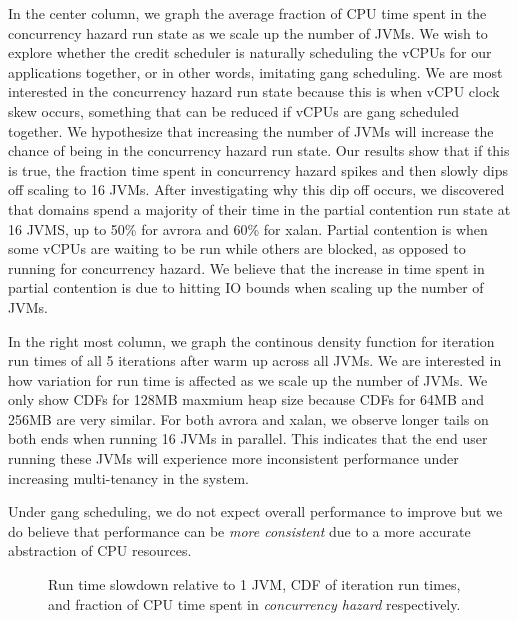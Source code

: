 \documentclass{sig-alternate}
\begin{document}
In the center column, we graph the average fraction of CPU time spent in the concurrency hazard run state as we scale up the number of JVMs. We wish to explore whether the credit scheduler is naturally scheduling the vCPUs for our applications together, or in other words, imitating gang scheduling. We are most interested in the concurrency hazard run state because this is when vCPU clock skew occurs, something that can be reduced if vCPUs are gang scheduled together. We hypothesize that increasing the number of JVMs will increase the chance of being in the concurrency hazard run state. Our results show that if this is true, the fraction time spent in concurrency hazard spikes and then slowly dips off scaling to 16 JVMs. After investigating why this dip off occurs, we discovered that domains spend a majority of their time in the partial contention run state at 16 JVMS, up to 50\% for avrora and 60\% for xalan. Partial contention is when some vCPUs are waiting to be run while others are blocked, as opposed to running for concurrency hazard. We believe that the increase in time spent in partial contention is due to hitting IO bounds when scaling up the number of JVMs.

In the right most column, we graph the continous density function for iteration run times of all 5 iterations after warm up across all JVMs. We are interested in how variation for run time is affected as we scale up the number of JVMs. We only show CDFs for 128MB maxmium heap size because CDFs for 64MB and 256MB are very similar. For both avrora and xalan, we observe longer tails on both ends when running 16 JVMs in parallel. This indicates that the end user running these JVMs will experience more inconsistent performance under increasing multi-tenancy in the system. 

Under gang scheduling, we do not expect overall performance to improve but we do believe that performance can be \textit{more consistent} due to a more accurate abstraction of CPU resources.

\begin{figure*}
\centering
{}
\caption{Run time slowdown relative to 1 JVM, CDF of iteration run times, and fraction of CPU time spent in \textit{concurrency hazard} respectively.}
\label{fig:overallperf}
\end{figure*}
\end{document}
